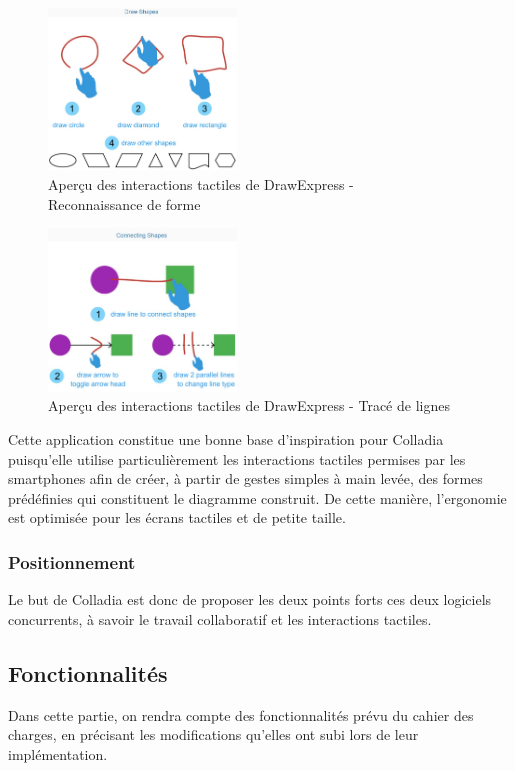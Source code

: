 \begin{figure}[!h]
	\centering
	\includegraphics[width=5cm]{img/DrawExpressRecognition}
	\caption{Aperçu des interactions tactiles de DrawExpress - \\Reconnaissance de forme}
\end{figure}

\begin{figure}[!h]
	\centering
	\includegraphics[width=5cm]{img/DrawExpressLinks}
	\caption{Aperçu des interactions tactiles de DrawExpress - Tracé de lignes}
\end{figure}

Cette application constitue une bonne base d'inspiration pour Colladia puisqu'elle  utilise particulièrement les interactions tactiles permises par les smartphones afin de créer, à partir de gestes simples à main levée, des formes prédéfinies qui constituent le diagramme construit. De cette manière, l'ergonomie est optimisée pour les écrans tactiles et de petite taille.



\subsubsection{Positionnement}
Le but de Colladia est donc de proposer les deux points forts ces deux logiciels concurrents, à savoir le travail collaboratif et les interactions tactiles.

\subsection{Fonctionnalités}
Dans cette partie, on rendra compte des fonctionnalités prévu du cahier des charges, en précisant les modifications qu'elles ont subi lors de leur implémentation.


